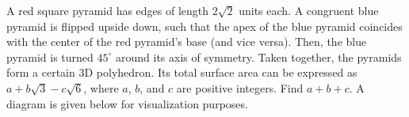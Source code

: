 A red square pyramid has edges of length $2\sqrt2$ units each. A congruent blue pyramid is flipped upside down, such that the apex of the blue pyramid coincides with the center of the red pyramid's base (and vice versa). Then, the blue pyramid is turned $45^\circ$ around its axis of symmetry. Taken together, the pyramids form a certain 3D polyhedron. Its total surface area can be expressed as $a + b \sqrt3 - c\sqrt6$, where $a$, $b$, and $c$ are positive integers. Find $a + b + c$. A diagram is given below for visualization purposes.
